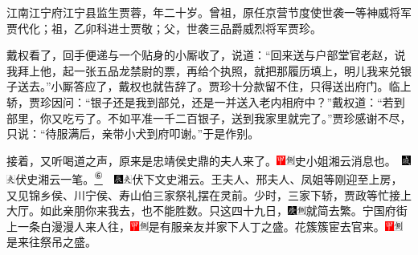 江南江宁府江宁县监生贾蓉，年二十岁。曾祖，原任京营节度使世袭一等神威将军贾代化；祖，乙卯科进士贾敬；父，世袭三品爵威烈将军贾珍。

戴权看了，回手便递与一个贴身的小厮收了，说道：``回来送与户部堂官老赵，说我拜上他，起一张五品龙禁尉的票，再给个执照，就把那履历填上，明儿我来兑银子送去。''小厮答应了，戴权也就告辞了。贾珍十分款留不住，只得送出府门。临上轿，贾珍因问：``银子还是我到部兑，还是一并送入老内相府中？''戴权道：``若到部里，你又吃亏了。不如平准一千二百银子，送到我家里就完了。''贾珍感谢不尽，只说：``待服满后，亲带小犬到府叩谢。''于是作别。

接着，又听喝道之声，原来是忠靖侯史鼎的夫人来了。{{\includegraphics[width=3mm]{../Images/00002}\includegraphics[width=3mm]{../Images/00011}\footnotesize \kaishu 史小姐湘云消息也。}　\includegraphics[width=3mm]{../Images/00005}\includegraphics[width=3mm]{../Images/00012}\footnotesize \kaishu 伏史湘云一笔。}\href{../Text/part0017_split_000.html\#lnkback_6_a}{\textsuperscript{⑥}}{　\includegraphics[width=3mm]{../Images/00009}\includegraphics[width=3mm]{../Images/00012}\footnotesize \kaishu 伏下文史湘云。}王夫人、邢夫人、凤姐等刚迎至上房，又见锦乡侯、川宁侯、寿山伯三家祭礼摆在灵前。少时，三家下轿，贾政等忙接上大厅。如此亲朋你来我去，也不能胜数。只这四十九日，{\includegraphics[width=3mm]{../Images/00004}\includegraphics[width=3mm]{../Images/00011}\footnotesize \kaishu 就简去繁。}宁国府街上一条白漫漫人来人往，{\includegraphics[width=3mm]{../Images/00002}\includegraphics[width=3mm]{../Images/00011}\footnotesize \kaishu 是有服亲友并家下人丁之盛。}花簇簇宦去官来。{\includegraphics[width=3mm]{../Images/00002}\includegraphics[width=3mm]{../Images/00011}\footnotesize \kaishu 是来往祭吊之盛。}

